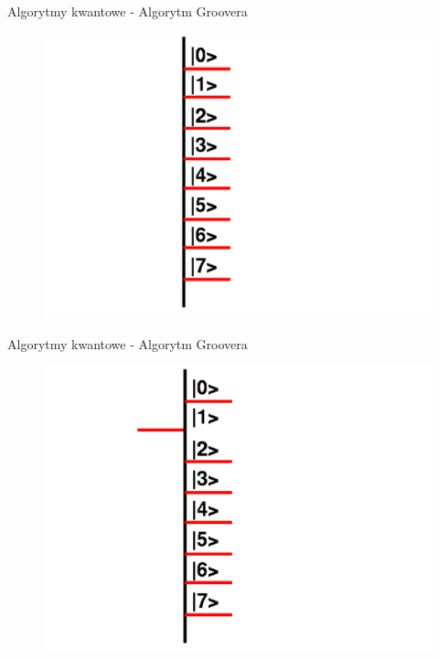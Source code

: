 \documentclass{beamer}
\begin{document}
	
	\begin{frame}{Algorytmy kwantowe - Algorytm Groovera}
			\vspace{0.5em}
			\begin{center}
				\begin{figure}
					\includegraphics[scale=0.35]{media/visualization1.png}
				\end{figure}
			\end{center}
			\vspace{0.5em}
	\end{frame}
	
	\begin{frame}{Algorytmy kwantowe - Algorytm Groovera}
		\vspace{0.5em}
		\begin{center}
			\begin{figure}
				\includegraphics[scale=0.35]{media/visualization2.png}
			\end{figure}
		\end{center}
		\vspace{0.5em}
	\end{frame}
		
\end{document}
